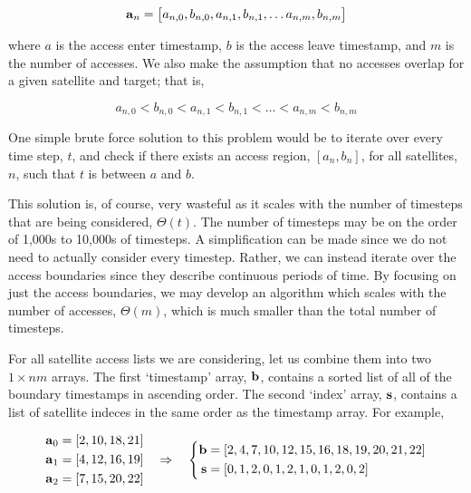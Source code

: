 \begin{equation} 
    \bm{\mathrm{a}}_{n} = \left[ a_{n,0}, b_{n,0}, a_{n,1}, b_{n,1}, \ldots a_{n,m}, b_{n,m} \right]
\end{equation}


where $a$ is the access enter timestamp, $b$ is the access leave timestamp, and
$m$ is the number of accesses. We also make the assumption that no accesses
overlap for a given satellite and target; that is,

\[
    a_{n,0} < b_{n,0} < a_{n,1} < b_{n,1} < \ldots < a_{n,m} < b_{n,m}
\]

One simple brute force solution to this problem would be to iterate over every
time step, $t$, and check if there exists an access region, $[a_n,b_n]$, for all
satellites, $n$, such that $t$ is between $a$ and $b$.

This solution is, of course, very wasteful as it scales with the number of
timesteps that are being considered, $\Theta(t)$. The number of timesteps may
be on the order of 1,000s to 10,000s of timesteps. A simplification can be made
since we do not need to actually consider every timestep. Rather, we can
instead iterate over the access boundaries since they describe continuous
periods of time. By focusing on just the access boundaries, we may develop an
algorithm which scales with the number of accesses, $\Theta(m)$, which is much
smaller than the total number of timesteps.

For all satellite access lists we are considering, let us combine them into two
$1\times nm$ arrays. The first `timestamp' array, $\bm{\mathrm{b}}$, contains a sorted
list of all of the boundary timestamps in ascending order. The second `index'
array, $\bm{\mathrm{s}}$, contains a list of satellite indeces in the same order as the
timestamp array. For example,

\begin{equation*}
    \begin{aligned} 
	\bm{\mathrm{a}}_{0} &= \left[ 2, 10, 18, 21  \right] \\
	\bm{\mathrm{a}}_{1} &= \left[ 4, 12, 16, 19  \right] \\
	\bm{\mathrm{a}}_{2} &= \left[ 7, 15, 20, 22  \right] \\
    \end{aligned}
    \quad \Rightarrow \quad
    \left \{ 
	\begin{aligned}
	    \bm{\mathrm{b}} &= [ 2 , 4 , 7 , 10 , 12 , 15 , 16 , 18 , 19 , 20 , 21 , 22  ] \\
	    \bm{\mathrm{s}} &= [ 0 , 1 , 2 , 0 , 1 , 2 , 1 , 0 , 1 , 2 , 0 , 2  ]
	\end{aligned}
    \right.
\end{equation*}

